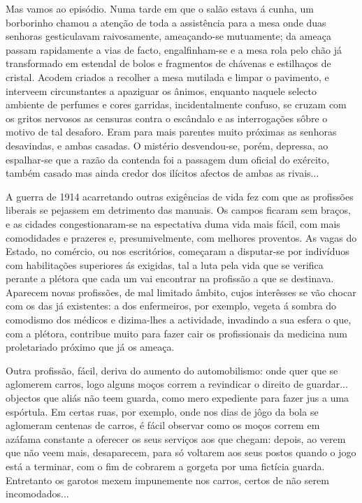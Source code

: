 \documentclass[9pt]{article}
\begin{document}
Mas vamos ao episódio. Numa tarde em que o salão estava á cunha, um borborinho chamou a aten\-ção de toda a assistência para a mesa onde duas senhoras gesticulavam raivosamente, ameaçando-se mutuamente; da ameaça passam
rapidamente a vias de facto, engalfinham-se e a mesa rola pelo chão já transformado em estendal de bolos e fragmentos de chávenas e esti\-lhaços de cristal. Acodem criados a reco\-lher a mesa mutilada e limpar o pavimento, e interveem circunstantes a apaziguar os ânimos, enquanto naquele selecto ambiente
de perfumes e cores garridas, incidentalmente confuso, se cruzam com os gritos nervosos as censuras contra o escândalo e as interroga\-ções sôbre o motivo de tal desaforo. Eram para mais parentes muito próximas as senhoras desavindas, e ambas casadas. O mistério desvendou-se, porém, depressa, ao espa\-lhar-se que a razão da contenda foi a passagem dum oficial do exército, também casado mas ainda credor dos ilícitos afectos de ambas as rivais...

A guerra de 1914 acarretando outras exi\-gên\-cias de vida fez com que as
profissões liberais se pejassem em detrimento das manuais. Os campos fi\-caram
sem braços, e as cidades congestionaram-se na espectativa duma vida mais
fácil, com mais comodidades e prazeres e, presumivelmente, com me\-lhores proventos. As vagas do Estado, no comércio, ou nos escritórios, começaram a disputar-se por indivíduos com habilita\-ções superiores ás exigidas, tal a luta pela
vida que se verifi\-ca perante a plétora que cada um vai encontrar na profissão a que se destinava. Aparecem novas profissões, de mal limitado âmbito,
cujos interêsses se vão chocar com os das já existentes: a dos enfermeiros,
por exemplo, vegeta á sombra do comodismo dos médicos e dizima-\-lhes a actividade, invadindo a sua esfera o que, com a plétora, contribue muito para fazer
cair os profissionais da medicina num proletariado próximo que já
os ameaça.

Outra profissão, fácil, deriva do aumento do automobilismo: onde quer
que se aglomerem carros, logo alguns moços correm a revindicar o direito de
guardar... objectos que aliás não teem guarda, como mero expediente para
fazer jus a uma espórtula. Em certas ruas, por exemplo, onde nos dias de jôgo
da bola se aglomeram centenas de carros, é fácil observar como os moços correm em azáfama constante a oferecer os seus serviços aos que chegam: depois,
ao verem que não veem mais, desaparecem, para só voltarem aos seus postos
quan\-do o jogo está a terminar, com o fim de cobrarem a gorgeta por uma fictícia guarda. Entretanto os garotos mexem impunemente nos carros, certos de não serem
incomodados...
\end{document}
